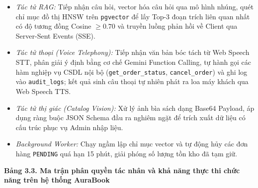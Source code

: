 \documentclass[11pt, a4paper]{report}
\begin{document}
\begin{enumerate}
    \begin{itemize}
        \item \textit{Tác tử RAG:} Tiếp nhận câu hỏi, vector hóa câu hỏi qua mô hình nhúng, quét chỉ mục đồ thị HNSW trên \texttt{pgvector} để lấy Top-3 đoạn trích liên quan nhất có độ tương đồng Cosine $\ge 0.70$ và truyền luồng phản hồi về Client qua Server-Sent Events (SSE).
        \item \textit{Tác tử thoại (Voice Telephony):} Tiếp nhận văn bản bóc tách từ Web Speech STT, phân giải ý định bằng cơ chế Gemini Function Calling, tự hành gọi các hàm nghiệp vụ CSDL nội bộ (\texttt{get\_order\_status}, \texttt{cancel\_order}) và ghi log vào \texttt{audit\_logs}; kết quả sinh câu thoại tự nhiên phát ra loa máy khách qua Web Speech TTS.
        \item \textit{Tác tử thị giác (Catalog Vision):} Xử lý ảnh bìa sách dạng Base64 Payload, áp dụng ràng buộc JSON Schema đầu ra nghiêm ngặt để trích xuất dữ liệu có cấu trúc phục vụ Admin nhập liệu.
        \item \textit{Background Worker:} Chạy ngầm lập chỉ mục vector và tự động hủy các đơn hàng \texttt{PENDING} quá hạn 15 phút, giải phóng số lượng tồn kho đã tạm giữ.
    \end{itemize}
\end{enumerate}

\vspace{0.3cm}
\noindent\textbf{Bảng 3.3. Ma trận phân quyền tác nhân và khả năng thực thi chức năng trên hệ thống AuraBook}
\end{document}
